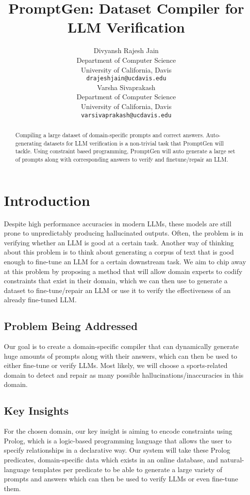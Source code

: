 \documentclass{article}
\title{PromptGen: Dataset Compiler for LLM Verification}
\author{ 
    Divyansh Rajesh Jain \\
    Department of Computer Science \\
    University of California, Davis \\
    \texttt{drajeshjain@ucdavis.edu} \\
    \And
    Varsha Sivaprakash\\
    Department of Computer Science \\
    University of California, Davis \\
    \texttt{varsivaprakash@ucdavis.edu} \\
}
\begin{document}
\maketitle


\begin{abstract}
  Compiling a large dataset of domain-specific prompts and correct answers.  Auto-generating datasets for LLM verification 
  is a non-trivial task that PromptGen will tackle.  Using constraint based programming, PromptGen will auto generate a large 
  set of prompts along with corresponding answers to verify and finetune/repair an LLM.
\end{abstract}


\section{Introduction}


Despite high performance accuracies in modern LLMs, these models are still 
prone to unpredictably producing hallucinated outputs. Often, 
the problem is in verifying whether an LLM is good at a certain task. 
Another way of thinking about this problem is to think about generating a corpus of text that is good enough to 
fine-tune an LLM for a certain downstream task. We aim to chip away at this problem by proposing a method that will allow 
domain experts to codify constraints that exist in their domain, which we can then use to generate a dataset to fine-tune/repair 
an LLM or use it to verify the effectiveness of an already fine-tuned LLM.



\subsection{Problem Being Addressed}


Our goal is to create a domain-specific compiler that can dynamically generate huge amounts of prompts along with their answers, which can then be used to either fine-tune or verify LLMs.  Most likely, we will choose a sports-related domain to detect and repair as many possible hallucinations/inaccuracies in this domain. 

\subsection{Key Insights}


For the chosen domain, our key insight is aiming to encode constraints using Prolog, which is a logic-based programming language that allows the user to specify relationships in a declarative way.  Our system will take these Prolog predicates, domain-specific data which exists in an online database, and natural-language templates per predicate to be able to generate a large variety of prompts and answers which can then be used to verify LLMs or even fine-tune them.  
\end{document}
